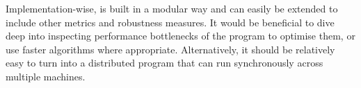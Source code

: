 Implementation-wise, \graffs is built in a modular way and can easily be extended to include other metrics and robustness measures.
It would be beneficial to dive deep into inspecting performance bottlenecks of the program to optimise them, or use faster algorithms where appropriate.
Alternatively, it should be relatively easy to turn \graffs into a distributed program that can run synchronously across multiple machines.
